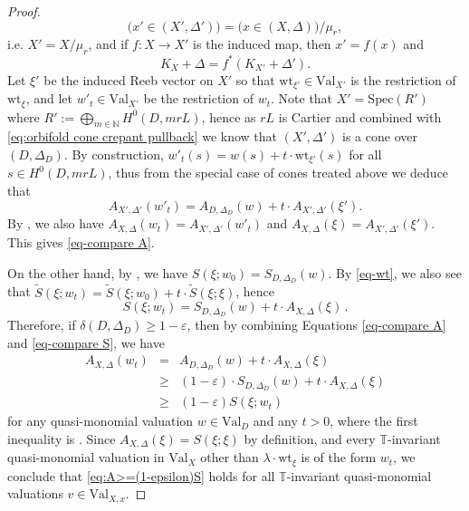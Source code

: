 \documentclass[12pt]{amsart}
\theoremstyle{definition}
\newcommand{\bN}{\mathbb{N}}
\newcommand{\bT}{\mathbb{T}}
\newcommand{\tS}{\widetilde{S}}
\newcommand{\cF}{\mathcal{F}}
\newcommand{\Spec}{\mathrm{Spec}}
\newcommand{\Val}{\mathrm{Val}}
\newcommand{\wt}{\mathrm{wt}}
\numberwithin{equation}{section}
\begin{document}
\begin{proof}
\[
\big(x'\in (X',\Delta')\big) = \big(x\in (X,\Delta)\big)/\mu_r,
\]
i.e. $X'=X/\mu_r$, and if $f\colon X\to X'$ is the induced map, then $x'=f(x)$ and 
\[
K_X+\Delta = f^*(K_{X'}+\Delta').
\]
Let $\xi'$ be the induced Reeb vector on $X'$ so that $\wt_{\xi'}\in \Val_{X'}$ is the restriction of $\wt_\xi$, and let $w'_t\in \Val_{X'}$ be the restriction of $w_t$. Note that $X'=\Spec(R')$ where $R':=\bigoplus_{m\in\bN} H^0(D,mrL)$, hence as $rL$ is Cartier and combined with \eqref{eq:orbifold cone crepant pullback} we know that $(X',\Delta')$ is a cone over $(D,\Delta_D)$. By construction, $w'_t(s) = w(s)+ t\cdot \wt_{\xi'}(s)$ for all $s\in H^0(D,mrL)$, thus from the special case of cones treated above we deduce that 
\[
A_{X',\Delta'}(w'_t) = A_{D,\Delta_D}(w)+t\cdot A_{X',\Delta'}(\xi').
\]
By \cite[Proof of Proposition 5.20(2)]{KM98}, we also have $A_{X,\Delta}(w_t)=A_{X',\Delta'}(w'_t)$ and $A_{X,\Delta}(\xi)=A_{X',\Delta'}(\xi')$. This gives \eqref{eq-compare A}.  



On the other hand, by \cite[(3.7)]{XZ-uniqueness}, we have $S(\xi;w_0) = S_{D,\Delta_D}(w)$. By \eqref{eq-wt}, we also see that $\tS(\xi;w_t) = \tS(\xi;w_0)+t\cdot \tS(\xi;\xi)$, hence 
\begin{equation}\label{eq-compare S}
S(\xi;w_t) = S_{D,\Delta_D}(w) + t\cdot A_{X,\Delta}(\xi)\, .
\end{equation}
Therefore, if $\delta(D,\Delta_D)\ge 1-\varepsilon$, then by combining  Equations \eqref{eq-compare A} and \eqref{eq-compare S}, we have
\begin{eqnarray*}
A_{X,\Delta}(w_t)&=&A_{D,\Delta_D}(w)+t\cdot A_{X,\Delta}(\xi) \\
                           &\ge& (1-\varepsilon)\cdot S_{D,\Delta_D}(w)+t\cdot A_{X,\Delta}(\xi) \\
                           &\ge &(1-\varepsilon)S(\xi;w_t)
\end{eqnarray*}
for any quasi-monomial valuation $w\in \Val_D$ and any $t>0$, where the first inequality is \cite[Theorem 4.8]{Xu-book}. Since $A_{X,\Delta}(\xi) = S(\xi;\xi)$ by definition, and every $\bT$-invariant quasi-monomial valuation in $\Val_{X}$ other than $\lambda\cdot \wt_\xi$ is of the form $w_t$, we conclude that \eqref{eq:A>=(1-epsilon)S} holds for all $\bT$-invariant quasi-monomial valuations $v\in \Val_{X,x}$.


\end{proof}
\end{document}
